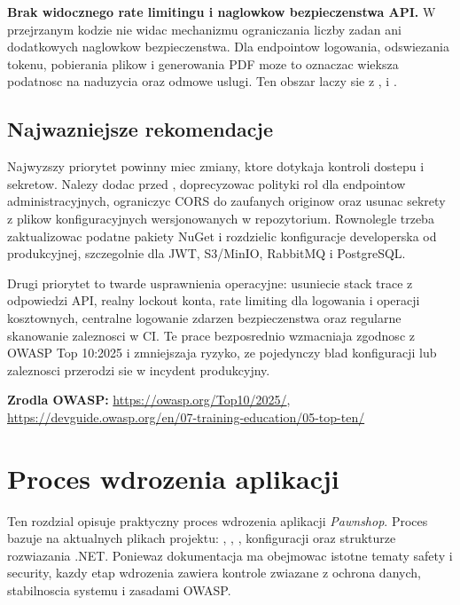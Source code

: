 \documentclass[12pt,a4paper]{article}
\begin{document}
\textbf{Brak widocznego rate limitingu i naglowkow bezpieczenstwa API.} W przejrzanym kodzie nie widac mechanizmu ograniczania liczby zadan ani dodatkowych naglowkow bezpieczenstwa. Dla endpointow logowania, odswiezania tokenu, pobierania plikow i generowania PDF moze to oznaczac wieksza podatnosc na naduzycia oraz odmowe uslugi. Ten obszar laczy sie z ,  i .

\subsection{Najwazniejsze rekomendacje}

Najwyzszy priorytet powinny miec zmiany, ktore dotykaja kontroli dostepu i sekretow. Nalezy dodac  przed , doprecyzowac polityki rol dla endpointow administracyjnych, ograniczyc CORS do zaufanych originow oraz usunac sekrety z plikow konfiguracyjnych wersjonowanych w repozytorium. Rownolegle trzeba zaktualizowac podatne pakiety NuGet i rozdzielic konfiguracje developerska od produkcyjnej, szczegolnie dla JWT, S3/MinIO, RabbitMQ i PostgreSQL.

Drugi priorytet to twarde usprawnienia operacyjne: usuniecie stack trace z odpowiedzi API, realny lockout konta, rate limiting dla logowania i operacji kosztownych, centralne logowanie zdarzen bezpieczenstwa oraz regularne skanowanie zaleznosci w CI. Te prace bezposrednio wzmacniaja zgodnosc z OWASP Top 10:2025 i zmniejszaja ryzyko, ze pojedynczy blad konfiguracji lub zaleznosci przerodzi sie w incydent produkcyjny.

\textbf{Zrodla OWASP:} \url{https://owasp.org/Top10/2025/}, \url{https://devguide.owasp.org/en/07-training-education/05-top-ten/}

\clearpage
\section{Proces wdrozenia aplikacji}

Ten rozdzial opisuje praktyczny proces wdrozenia aplikacji \textit{Pawnshop}. Proces bazuje na aktualnych plikach projektu: , , , konfiguracji  oraz strukturze rozwiazania .NET. Poniewaz dokumentacja ma obejmowac istotne tematy safety i security, kazdy etap wdrozenia zawiera kontrole zwiazane z ochrona danych, stabilnoscia systemu i zasadami OWASP.
\end{document}
